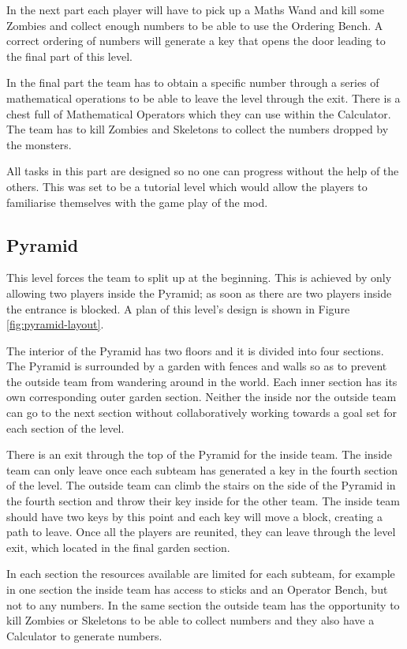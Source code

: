In the next part each player will have to pick up a Maths Wand and kill some Zombies and collect enough numbers to be able to use the Ordering Bench. A correct ordering of numbers will generate a key that opens the door leading to the final part of this level.

In the final part the team has to obtain a specific number through a series of mathematical operations to be able to leave the level through the exit. There is a chest full of Mathematical Operators which they can use within the Calculator. The team has to kill Zombies and Skeletons to collect the numbers dropped by the monsters.

All tasks in this part are designed so no one can progress without the help of the others. This was set to be a tutorial level which would allow the players to familiarise themselves with the game play of the mod.

\subsection{Pyramid}
This level forces the team to split up at the beginning. This is achieved by only allowing two players inside the Pyramid;
as soon as there are two players inside the entrance is blocked. A plan of this level's design is shown in
Figure \ref{fig:pyramid-layout}.

The interior of the Pyramid has two floors and it is divided into four sections. The Pyramid is surrounded by a garden with fences and walls so as to prevent the outside team from wandering around in the world. Each inner section has its own corresponding outer garden section. Neither the inside nor the outside team can go to the next section without collaboratively working towards a goal set for each section of the level.

There is an exit through the top of the Pyramid for the inside team. The inside team can only leave once each subteam has generated a key in the fourth section of the level. The outside team can climb the stairs on the side of the Pyramid in the fourth section and throw their key inside for the other team. The inside team should have two keys by this point and each key will move a block, creating a path to leave. Once all the players are reunited, they can leave through the level exit, which located in the final garden section.

In each section the resources available are limited for each subteam, for example in one section the inside team has access to sticks and an Operator Bench, but not to any numbers. In the same section the outside team has the opportunity to kill Zombies or Skeletons to be able to collect numbers and they also have a Calculator to generate numbers.

